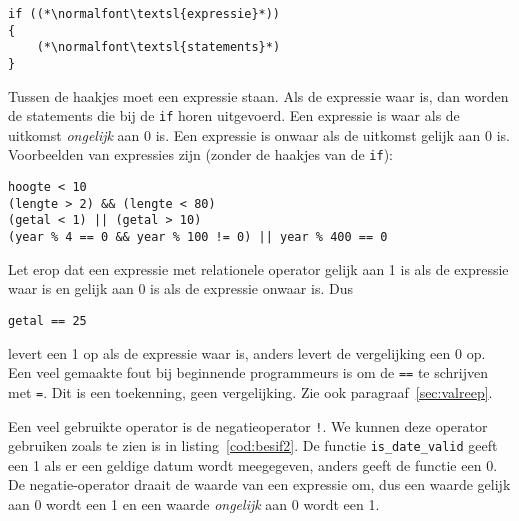 \begin{lstlisting}[caption=Algemene opzet van het \texttt{if}-statement.,label=cod:besif1]
if ((*\normalfont\textsl{expressie}*))
{
    (*\normalfont\textsl{statements}*)
}
\end{lstlisting}

Tussen de haakjes moet een expressie staan. Als de expressie waar is, dan worden de statements die bij de \texttt{if} horen uitgevoerd. Een expressie is waar als de uitkomst \textsl{ongelijk} aan 0 is. Een expressie is onwaar als de uitkomst gelijk aan 0 is. Voorbeelden van expressies zijn (zonder de haakjes van de \texttt{if}):


\begin{lstlisting}[style=lstoneline]
hoogte < 10
(lengte > 2) && (lengte < 80)
(getal < 1) || (getal > 10)
(year % 4 == 0 && year % 100 != 0) || year % 400 == 0
\end{lstlisting}

Let erop dat een expressie met relationele operator gelijk aan 1 is als de expressie waar is en gelijk aan 0 is als de expressie onwaar is. Dus

\hspace*{1em}\texttt{getal == 25}

levert een 1 op als de expressie waar is, anders levert de vergelijking een 0 op. Een veel gemaakte fout bij beginnende programmeurs is om de \texttt{==} te schrijven met \texttt{=}. Dit is een toekenning, geen vergelijking. Zie ook paragraaf~\ref{sec:valreep}.

Een veel gebruikte operator is de negatieoperator \texttt{!}. We kunnen deze operator gebruiken zoals te zien is in listing~\ref{cod:besif2}. De functie \texttt{is\_date\_valid} geeft een 1 als er een geldige datum wordt meegegeven, anders geeft de functie een 0. De negatie-operator draait de waarde van een expressie om, dus een waarde gelijk aan 0 wordt een 1 en een waarde \textsl{ongelijk} aan 0 wordt een 1.


